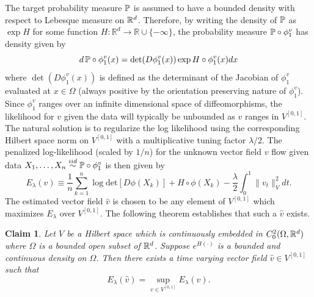 \documentclass[noinfoline]{imsart}
\newtheorem{claim}{Claim}
\begin{document}
The target probability measure $\Bbb P$ is assumed to have a bounded density with respect to Lebesque measure on $\Bbb R^d$. 
Therefore, by writing the density of $\Bbb P$ as $\exp H$ for some  function $H\colon\mathbb R^d\rightarrow \mathbb R\cup \{-\infty\}$, the probability measure $\Bbb P\circ \phi^v_1$ has density given by
 \[ d\,\Bbb P\circ \phi_1^v(x)  =\det (D\phi_1^v(x))  \exp H \circ \phi_1^v(x) dx  \]
 where $\det (D\phi^v_1(x))$ is defined as the  determinant of the Jacobian of $\phi^v_1$ evaluated at $x\in \Omega$ (always positive by the orientation preserving nature of $\phi^v_1$). 
Since $\phi_1^v$ ranges over an infinite dimensional space of diffeomorphisms, the  likelihood for $v$ given the data  will typically be unbounded as $v$ ranges in $V^{[0,1]}$. The natural solution is to regularize the log likelihood using the corresponding  Hilbert space norm on $V^{[0,1]}$ with a  multiplicative tuning factor $\lambda/2$. 
The penalized log-likelihood (scaled by $1/n$) for the unknown vector field $v$ flow given data $X_1,\ldots, X_n\overset{iid}\sim \Bbb P\circ \phi^v_1$ is then given by
 \begin{equation}
 \label{energy1}
 E_\lambda(v)\equiv  \frac{1}{n} \sum_{k=1}^n \log\text{det}[D\phi(X_k) ]+H\circ\phi(X_k)  - \frac{\lambda}{2}  \int_0^1 \| v_t \|_V^2 dt.
 \end{equation}
 The estimated vector field $\hat v$ is chosen to be any element of $V^{[0,1]}$ which maximizes $E_\lambda$ over $V^{[0,1]}$.
 The following theorem establishes that such a $\hat v$ exists.
\begin{claim}
\label{claim1}
Let $V$ be a  Hilbert space which is  continuously  embedded in $C_0^2(\Omega, \Bbb R^d)$ where $\Omega$ is a bounded open subset of $\Bbb R^d$. Suppose $e^{H(\cdot)}$ is a bounded and continuous density  on $\Omega$. Then there exists a time varying vector field $\hat v \in V^{[0,1]}$ such that 
\begin{equation}
\label{exist}
E_\lambda(\hat v)=\sup_{v\in V^{[0,1]}}E_\lambda(v).
\end{equation}
\end{claim}
\end{document}
